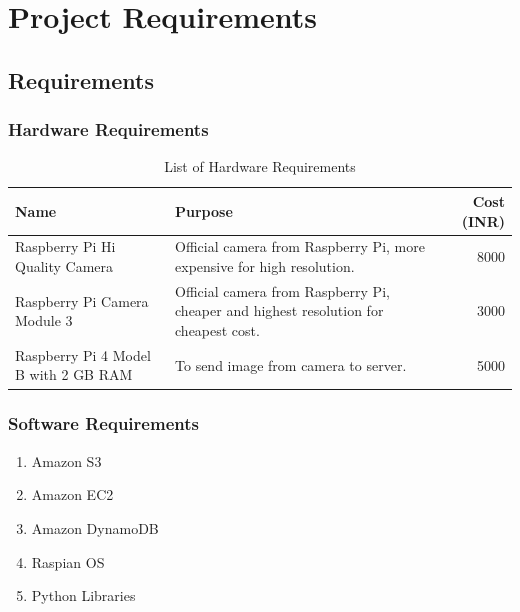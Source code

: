 \documentclass[openany]{report}
\begin{document}
\chapter{Project Requirements}

\section{Requirements}
\subsection{Hardware Requirements}
\begin{table}[h!]
    \centering
    \begin{tabular}{|l|p{8cm}|r|}
    \hline
    \textbf{Name} & \textbf{Purpose} & \textbf{Cost (INR)} \\
    \hline
    Raspberry Pi Hi Quality Camera & Official camera from Raspberry Pi, more expensive for high resolution. & 8000 \\
    \hline
    Raspberry Pi Camera Module 3 & Official camera from Raspberry Pi, cheaper and highest resolution for cheapest cost. & 3000 \\
    \hline
    Raspberry Pi 4 Model B with 2 GB RAM & To send image from camera to server. & 5000 \\
    \hline
    \end{tabular}
    \caption{List of Hardware Requirements}
    \label{tab:hardware_requirements}
\end{table}
\subsection{Software Requirements}

\begin{enumerate}
    \item Amazon S3
\item Amazon EC2
\item Amazon DynamoDB
\item Raspian OS
\item Python Libraries

\end{enumerate}
\end{document}
